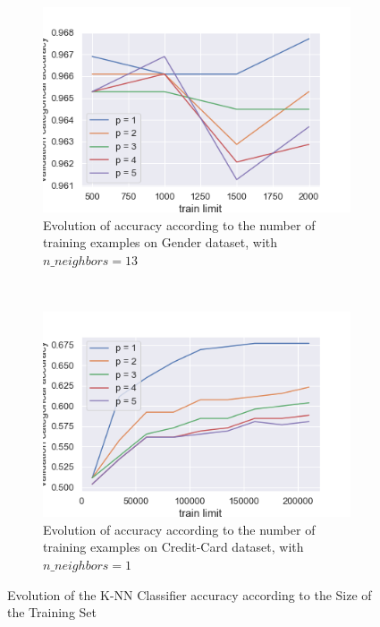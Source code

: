 \documentclass[10pt]{article}
\begin{document}
		\paragraph*{}
			\begin{figure}[h]
				\centering
				\begin{subfigure}[]{0.45\columnwidth}
					\centering
					\includegraphics[width=\linewidth]{../graphics/knn_gender_train_limit.png}
					\caption{Evolution of accuracy according to the number of training examples on Gender dataset, with $n\_neighbors = 13$}
					\label{knn:g_train_limit}
				\end{subfigure}
				~
				\begin{subfigure}[]{0.45\columnwidth}
					\centering
					\includegraphics[width=\linewidth]{../graphics/knn_creditcard_train_limit.png}
					\caption{Evolution of accuracy according to the number of training examples on Credit-Card dataset, with $n\_neighbors = 1$}
					\label{knn:cc_train_limit}
				\end{subfigure}
				\caption{Evolution of the K-NN Classifier accuracy according to the Size of the Training Set}
				\label{knn:train_limit}
			\end{figure}
\end{document}
